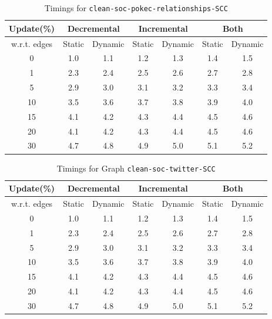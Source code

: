 \begin{table}[H]
    \centering
    \caption{Timings for \texttt{clean-soc-pokec-relationships-SCC}}
    \begin{tabular}{|c|c|c|c|c|c|c|}
        \hline
        \textbf{Update(\%)} & \multicolumn{2}{c|}{\textbf{Decremental}} & \multicolumn{2}{c|}{\textbf{Incremental}} & \multicolumn{2}{c|}{\textbf{Both}} \\
        \hline
        w.r.t. edges & Static &  Dynamic & Static & Dynamic & Static & Dynamic \\
        \hline
        0 & 1.0 & 1.1 & 1.2 & 1.3 & 1.4 & 1.5 \\
        1 & 2.3 & 2.4 & 2.5 & 2.6 & 2.7 & 2.8 \\
        5 & 2.9 & 3.0 & 3.1 & 3.2 & 3.3 & 3.4 \\
        10 & 3.5 & 3.6 & 3.7 & 3.8 & 3.9 & 4.0 \\
        15 & 4.1 & 4.2 & 4.3 & 4.4 & 4.5 & 4.6 \\
        20 & 4.1 & 4.2 & 4.3 & 4.4 & 4.5 & 4.6 \\
        30 & 4.7 & 4.8 & 4.9 & 5.0 & 5.1 & 5.2 \\
        \hline
    \end{tabular}
    \label{tab:timed_results_g5}
\end{table}

\begin{table}[H]
    \centering
    \caption{Timings for Graph \texttt{clean-soc-twitter-SCC} }
    \begin{tabular}{|c|c|c|c|c|c|c|}
        \hline
        \textbf{Update(\%)} & \multicolumn{2}{c|}{\textbf{Decremental}} & \multicolumn{2}{c|}{\textbf{Incremental}} & \multicolumn{2}{c|}{\textbf{Both}} \\
        \hline
        w.r.t. edges & Static &  Dynamic & Static & Dynamic & Static & Dynamic \\
        \hline
        0 & 1.0 & 1.1 & 1.2 & 1.3 & 1.4 & 1.5 \\
        1 & 2.3 & 2.4 & 2.5 & 2.6 & 2.7 & 2.8 \\
        5 & 2.9 & 3.0 & 3.1 & 3.2 & 3.3 & 3.4 \\
        10 & 3.5 & 3.6 & 3.7 & 3.8 & 3.9 & 4.0 \\
        15 & 4.1 & 4.2 & 4.3 & 4.4 & 4.5 & 4.6 \\
        20 & 4.1 & 4.2 & 4.3 & 4.4 & 4.5 & 4.6 \\
        30 & 4.7 & 4.8 & 4.9 & 5.0 & 5.1 & 5.2 \\
        \hline
    \end{tabular}
    \label{tab:timed_results_g6}
\end{table}

